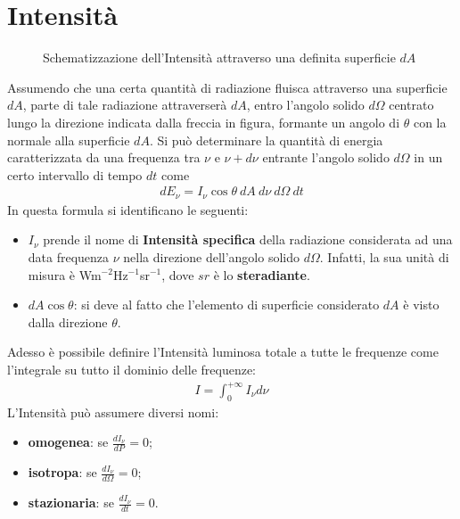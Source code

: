 \documentclass[a4paper, oneside]{book}
\begin{document}
\section{Intensità}
\begin{figure}
    \centering
    \caption{Schematizzazione dell'Intensità attraverso una definita superficie $dA$}
\end{figure}
Assumendo che una certa quantità di radiazione fluisca attraverso una superficie $dA$, parte di tale radiazione attraverserà $dA$, entro l'angolo solido $d\Omega$ centrato lungo 
la direzione indicata dalla freccia in figura, formante un angolo di $\theta$ con la normale alla 
superficie $dA$. Si può determinare la quantità di energia caratterizzata da una frequenza tra
$\nu$ e $\nu + d\nu$ entrante l'angolo solido $d\Omega$ in un certo intervallo di tempo $dt$ come
\begin{align}
    dE_\nu = I_\nu \cos\theta \ dA \ d\nu \ d\Omega \ dt
\end{align}
In questa formula si identificano le seguenti:
\begin{itemize}
    \item $I_\nu$ prende il nome di \textbf{Intensità specifica} della radiazione 
considerata ad una data frequenza $\nu$ nella direzione dell'angolo solido $d\Omega$.
Infatti, la sua unità di misura è Wm$^{-2}$Hz$^{-1}$sr$^{-1}$, dove
$sr$ è lo \textbf{steradiante}. 
    \item $dA\cos\theta$: si deve al fatto che l'elemento di superficie considerato $dA$  è visto dalla
    direzione $\theta$. 
\end{itemize}
Adesso è possibile definire l'Intensità luminosa totale a tutte le frequenze come l'integrale su 
tutto il dominio delle frequenze:
\begin{align}
    I = \int_{0}^{+\infty } I_\nu d\nu 
\end{align}
L'Intensità può assumere diversi nomi:
\begin{itemize}
    \item \textbf{omogenea}: se $\frac{dI_\nu}{dP} = 0$;
    \item \textbf{isotropa}: se $\frac{dI_\nu}{d\Omega} = 0$;
    \item \textbf{stazionaria}: se $\frac{dI_\nu}{dt} = 0$. 
\end{itemize}
\end{document}

